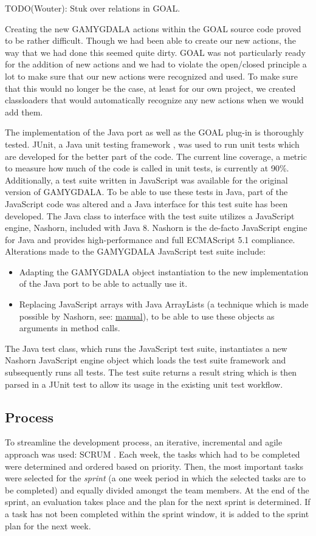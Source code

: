 TODO(Wouter): Stuk over relations in GOAL.

Creating the new GAMYGDALA actions within the GOAL source code proved to be rather difficult. Though we had been able to create our new actions, the way that we had done this seemed quite dirty. GOAL was not particularly ready for the addition of new actions and we had to violate the open/closed principle a lot to make sure that our new actions were recognized and used. To make sure that this would no longer be the case, at least for our own project, we created classloaders that would automatically recognize any new actions when we would add them.

The implementation of the Java port as well as the GOAL plug-in is thoroughly tested. JUnit, a Java unit testing framework \citep{junit}, was used to run unit tests which are developed for the better part of the code. The current line coverage, a metric to measure how much of the code is called in unit tests, is currently at 90\%. Additionally, a test suite written in JavaScript was available for the original version of GAMYGDALA. To be able to use these tests in Java, part of the JavaScript code was altered and a Java interface for this test suite has been developed. The Java class to interface with the test suite utilizes a JavaScript engine, Nashorn, included with Java 8. Nashorn is the de-facto JavaScript engine for Java and provides high-performance \citep{projnashorn} and full ECMAScript 5.1 compliance. Alterations made to the GAMYGDALA JavaScript test suite include:
\begin{itemize}
\item Adapting the GAMYGDALA object instantiation to the new implementation of the Java port to be able to actually use it.
\item Replacing JavaScript arrays with Java ArrayLists (a technique which is made possible by Nashorn, see: \href{http://docs.oracle.com/javase/8/docs/technotes/guides/scripting/prog_guide/javascript.html#A1147187}{manual}), to be able to use these objects as arguments in method calls.
\end{itemize}
The Java test class, which runs the JavaScript test suite, instantiates a new Nashorn JavaScript engine object which loads the test suite framework and subsequently runs all tests. The test suite returns a result string which is then parsed in a JUnit test to allow its usage in the existing unit test workflow.

\subsection{Process}
To streamline the development process, an iterative, incremental and agile approach was used: SCRUM \citep{scrum}. Each week, the tasks which had to be completed were determined and ordered based on priority. Then, the most important tasks were selected for the \textit{sprint} (a one week period in which the selected tasks are to be completed) and equally divided amongst the team members. At the end of the sprint, an evaluation takes place and the plan for the next sprint is determined. If a task has not been completed within the sprint window, it is added to the sprint plan for the next week.

